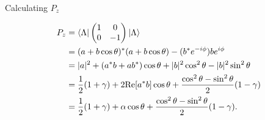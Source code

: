 \documentclass[
	xcolor=dvipsnames,
	10pt, 
	]{beamer}
\begin{document}
\begin{frame}{Calculating $P_z$}
	\begin{block}{}
		\begin{align}
			P_z& =\langle \Lambda| \begin{pmatrix} 1&0\\ 0&-1 \end{pmatrix} |\Lambda\rangle\nonumber\\
			&= (a+b\cos\theta)^*(a+b\cos\theta)-(b^*e^{-i\phi})be^{i\phi}\nonumber\\
			&= |a|^2 + (a^*b+ab^*)\cos\theta + |b|^2\cos^2\theta -|b|^2\sin^2\theta\nonumber\\
			&= \frac{1}{2}(1+\gamma) + 2\mathrm{Re}[a^*b]\cos\theta  + \frac{\cos^2\theta-\sin^2\theta}{2}(1-\gamma)\nonumber\\
			&=\frac{1}{2}(1+\gamma) + \alpha\cos\theta  + \frac{\cos^2\theta-\sin^2\theta}{2}(1-\gamma)
.		\end{align}
	\end{block}
\end{frame}
\end{document}
